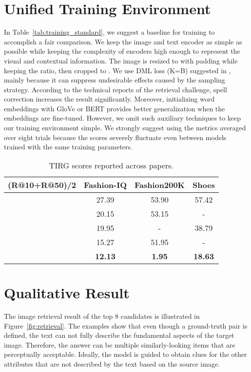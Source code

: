 \documentclass[10pt,twocolumn,letterpaper]{article}
\begin{document}
\section{Unified Training Environment}
In Table~\ref{tab:training_standard}, we suggest a baseline for training to accomplish a fair comparison. We keep the image and text encoder as simple as possible while keeping the complexity of encoders high enough to represent the visual and contextual information. The image is resized to  with padding while keeping the ratio, then cropped to . We use DML loss (K=B) suggested in \cite{vo2019composing}, mainly because it can suppress undesirable effects caused by the sampling strategy. According to the technical reports of the retrieval challenge, spell correction increases the result significantly.
Moreover, initializing word embeddings with GloVe or BERT provides better generalization when the embeddings are fine-tuned. However, we omit such auxiliary techniques to keep our training environment simple. We strongly suggest using the metrics averaged over eight trials because the scores severely fluctuate even between models trained with the same training parameters.

\begin{table}[H]
    \caption{TIRG scores reported across papers.}
    \centering
    \begin{adjustbox}{width=0.45\textwidth}
    \begin{tabular}{cccc}
    \toprule
    (R@10+R@50)/2 & Fashion-IQ & Fashion200K & Shoes \\ \hline \hline
    ~\cite{chen2020image}           & 27.39 & 53.90 & 57.42 \\
    ~\cite{anwaar2020compositional} & 20.15 & 53.15 & - \\
    ~\cite{jandial2020trace}        & 19.95 & - & 38.79 \\
    ~\cite{chen2020learning}        & 15.27 & 51.95 & - \\ \hline
               & \textbf{12.13} & \textbf{1.95} & \textbf{18.63} \\
    \bottomrule
    \end{tabular}
    \end{adjustbox}
    \label{tab:inconsistency}
\end{table}

\section{Qualitative Result}
The image retrieval result of the top 8 candidates is illustrated in Figure~\ref{fig:retrieval}. The examples show that even though a ground-truth  pair is defined, the text can not fully describe the fundamental aspects of the target image. Therefore, the answer can be multiple similarly-looking items that are perceptually acceptable. Ideally, the model is guided to obtain clues for the other attributes that are not described by the text based on the source image.
\end{document}
